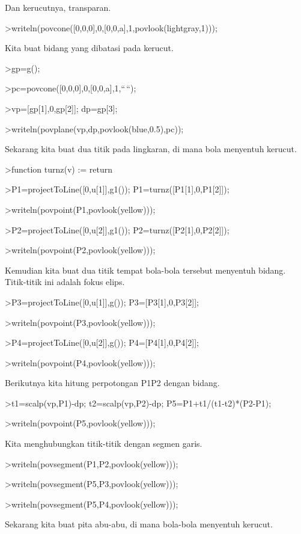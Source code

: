 \documentclass[
]{book}
\begin{document}
Dan kerucutnya, transparan.

\textgreater writeln(povcone({[}0,0,0{]},0,{[}0,0,a{]},1,povlook(lightgray,1)));

Kita buat bidang yang dibatasi pada kerucut.

\textgreater gp=g();

\textgreater pc=povcone({[}0,0,0{]},0,{[}0,0,a{]},1,``\,``);

\textgreater vp={[}gp{[}1{]},0,gp{[}2{]}{]}; dp=gp{[}3{]};

\textgreater writeln(povplane(vp,dp,povlook(blue,0.5),pc));

Sekarang kita buat dua titik pada lingkaran, di mana bola menyentuh kerucut.

\textgreater function turnz(v) := return

\textgreater P1=projectToLine({[}0,u{[}1{]}{]},g1()); P1=turnz({[}P1{[}1{]},0,P1{[}2{]}{]});

\textgreater writeln(povpoint(P1,povlook(yellow)));

\textgreater P2=projectToLine({[}0,u{[}2{]}{]},g1()); P2=turnz({[}P2{[}1{]},0,P2{[}2{]}{]});

\textgreater writeln(povpoint(P2,povlook(yellow)));

Kemudian kita buat dua titik tempat bola-bola tersebut menyentuh bidang. Titik-titik ini adalah fokus elips.

\textgreater P3=projectToLine({[}0,u{[}1{]}{]},g()); P3={[}P3{[}1{]},0,P3{[}2{]}{]};

\textgreater writeln(povpoint(P3,povlook(yellow)));

\textgreater P4=projectToLine({[}0,u{[}2{]}{]},g()); P4={[}P4{[}1{]},0,P4{[}2{]}{]};

\textgreater writeln(povpoint(P4,povlook(yellow)));

Berikutnya kita hitung perpotongan P1P2 dengan bidang.

\textgreater t1=scalp(vp,P1)-dp; t2=scalp(vp,P2)-dp; P5=P1+t1/(t1-t2)*(P2-P1);

\textgreater writeln(povpoint(P5,povlook(yellow)));

Kita menghubungkan titik-titik dengan segmen garis.

\textgreater writeln(povsegment(P1,P2,povlook(yellow)));

\textgreater writeln(povsegment(P5,P3,povlook(yellow)));

\textgreater writeln(povsegment(P5,P4,povlook(yellow)));

Sekarang kita buat pita abu-abu, di mana bola-bola menyentuh kerucut.
\end{document}
